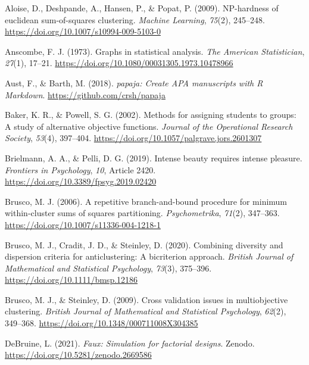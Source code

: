 \documentclass[
  man,floatsintext]{apa7}
\newlength{\cslhangindent}
\newlength{\cslentryspacingunit} %
\newenvironment{CSLReferences}[2] %
 {%
  \setlength{\parindent}{0pt}
  \ifodd #1
  \let\oldpar\par
  \def\par{\hangindent=\cslhangindent\oldpar}
  \fi
  \setlength{\parskip}{#2\cslentryspacingunit}
 }%
 {}
\begin{document}
\hypertarget{refs}{}
\begin{CSLReferences}{1}{0}
\leavevmode{}%
Aloise, D., Deshpande, A., Hansen, P., \& Popat, P. (2009). NP-hardness of euclidean sum-of-squares clustering. \emph{Machine Learning}, \emph{75}(2), 245--248. \url{https://doi.org/10.1007/s10994-009-5103-0}

\leavevmode{}%
Anscombe, F. J. (1973). Graphs in statistical analysis. \emph{The American Statistician}, \emph{27}(1), 17--21. \url{https://doi.org/10.1080/00031305.1973.10478966}

\leavevmode{}%
Aust, F., \& Barth, M. (2018). \emph{{papaja}: {Create} {APA} manuscripts with {R Markdown}}. \url{https://github.com/crsh/papaja}

\leavevmode{}%
Baker, K. R., \& Powell, S. G. (2002). Methods for assigning students to groups: A study of alternative objective functions. \emph{Journal of the Operational Research Society}, \emph{53}(4), 397--404. \url{https://doi.org/10.1057/palgrave.jors.2601307}

\leavevmode{}%
Brielmann, A. A., \& Pelli, D. G. (2019). Intense beauty requires intense pleasure. \emph{Frontiers in Psychology}, \emph{10}, Article 2420. \url{https://doi.org/10.3389/fpsyg.2019.02420}

\leavevmode{}%
Brusco, M. J. (2006). A repetitive branch-and-bound procedure for minimum within-cluster sums of squares partitioning. \emph{Psychometrika}, \emph{71}(2), 347--363. \url{https://doi.org/10.1007/s11336-004-1218-1}

\leavevmode{}%
Brusco, M. J., Cradit, J. D., \& Steinley, D. (2020). Combining diversity and dispersion criteria for anticlustering: A bicriterion approach. \emph{British Journal of Mathematical and Statistical Psychology}, \emph{73}(3), 375--396. \url{https://doi.org/10.1111/bmsp.12186}

\leavevmode{}%
Brusco, M. J., \& Steinley, D. (2009). Cross validation issues in multiobjective clustering. \emph{British Journal of Mathematical and Statistical Psychology}, \emph{62}(2), 349--368. \url{https://doi.org/10.1348/000711008X304385}

\leavevmode{}%
DeBruine, L. (2021). \emph{Faux: Simulation for factorial designs}. Zenodo. \url{https://doi.org/10.5281/zenodo.2669586}


\end{CSLReferences}
\end{document}
